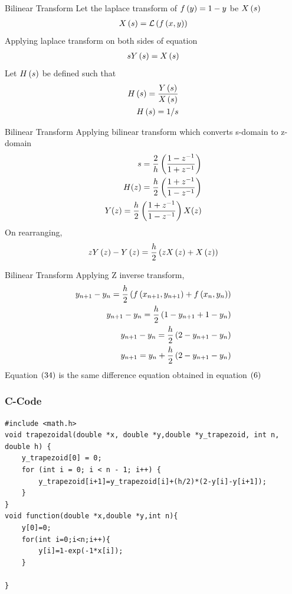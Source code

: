 \documentclass{beamer}
\begin{document}
\begin{frame}{Bilinear Transform}
Let the laplace transform of $f\left(y\right)=1-y$ be $X\left(s\right)$
\begin{align}
    X\left(s\right)=\mathcal{L}\left(f\left(x,y\right)\right)
\end{align}
Applying laplace transform on both sides of equation 
\begin{align}
    sY\left(s\right)=X\left(s\right)
\end{align}
Let $H\left(s\right)$ be defined such that
\begin{align}
    H\left(s\right)=\frac{Y\left(s\right)}{X\left(s\right)}\\
    H\left(s\right)=1/s
\end{align}  
\end{frame}

\begin{frame}{Bilinear Transform}
Applying bilinear transform which converts s-domain to z-domain
\begin{align}
    s = \frac{2}{h} \left(\frac{1 - z^{-1}}{1 + z^{-1}}\right) \\
    H(z) = \frac{h}{2} \left(\frac{1 + z^{-1}}{1 - z^{-1}}\right) \\
    Y(z) = \frac{h}{2} \left(\frac{1 + z^{-1}}{1 - z^{-1}}\right) X(z) 
\end{align}
On rearranging,
\begin{align}
    zY\left(z\right)-Y\left(z\right)=\frac{h}{2}\left(zX\left(z\right)+X\left(z\right)\right)
\end{align}
\end{frame}
\begin{frame}{Bilinear Transform}
Applying Z inverse transform,
\begin{align}
    y_{n+1}-y_{n}=\frac{h}{2}\left(f\left(x_{n+1},y_{n+1}\right)+f\left(x_n,y_n\right)\right)\\
    y_{n+1}-y_{n}=\frac{h}{2}\left(1-y_{n+1}+1-y_n\right)\\
    y_{n+1}-y_{n}=\frac{h}{2}\left(2-y_{n+1}-y_n\right)\\
    y_{n+1}=y_{n}+\frac{h}{2}\left(2-y_{n+1}-y_n\right)
\end{align}
Equation $\left(34\right)$ is the same difference equation obtained in equation $\left(6\right)$
\end{frame}
\begin{frame}[fragile]
\frametitle{C-Code}
\begin{verbatim}
#include <math.h>
void trapezoidal(double *x, double *y,double *y_trapezoid, int n, double h) {
    y_trapezoid[0] = 0; 
    for (int i = 0; i < n - 1; i++) {
        y_trapezoid[i+1]=y_trapezoid[i]+(h/2)*(2-y[i]-y[i+1]);
    }
}
void function(double *x,double *y,int n){
	y[0]=0;
	for(int i=0;i<n;i++){
		y[i]=1-exp(-1*x[i]);
	}

}
\end{verbatim}   
\end{frame}
\end{document}
